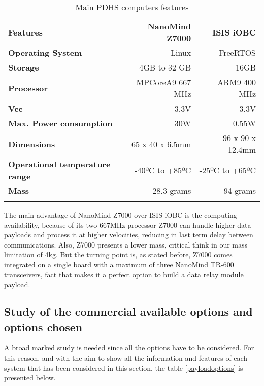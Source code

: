 \pagebreak
\begin{longtable}{| l | r | r |}
	
	\hline
	\rowcolor[gray]{0.60} \multicolumn{3}{|c|}{\textbf{PDHS computers options}}\\
	\hline
		
	\hline
	\rowcolor[gray]{0.75}	\textbf{Features} &  \textbf{NanoMind Z7000} & \textbf{ISIS iOBC} \\
	\hline
		
	\cellcolor[gray]{0.85} \textbf{Operating System} & Linux  & FreeRTOS\\
	\cellcolor[gray]{0.85} \textbf{Storage} & 4GB to 32 GB& 16GB\\
	\cellcolor[gray]{0.85} \textbf{Processor} & MPCoreA9 667 MHz& ARM9 400 MHz\\
	\cellcolor[gray]{0.85} \textbf{Vcc} & 3.3V&3.3V \\
	\cellcolor[gray]{0.85} \textbf{Max. Power consumption} & 30W& 0.55W\\
	\cellcolor[gray]{0.85} \textbf{Dimensions} & 65 x 40 x 6.5mm & 96 x 90 x 12.4mm\\
	\cellcolor[gray]{0.85} \textbf{Operational temperature range} & -40ºC to +85ºC & -25ºC to +65ºC\\
	\cellcolor[gray]{0.85} \textbf{Mass} & 28.3 grams&94 grams \\
	\hline
		
\caption{Main PDHS computers features}
\label{computers}	
\end{longtable}

The main advantage of NanoMind Z7000 over ISIS iOBC is the computing availability, because of its two 667MHz processor Z7000 can handle higher data payloads and process it at higher velocities, reducing in last term delay between communications. Also, Z7000 presents a lower mass, critical think in our mass limitation of 4kg. But the turning point is, as stated before, Z7000 comes integrated on a single board with a maximum of three NanoMind TR-600 transceivers, fact that makes it a perfect option to build a data relay module payload.

\subsection{Study of the commercial available options and options chosen}
A broad marked study is needed since all the options have to be considered. For this reason, and with the aim to show all the information and features of each system that has been considered in this section, the table \ref{payloadoptions} is presented below.

